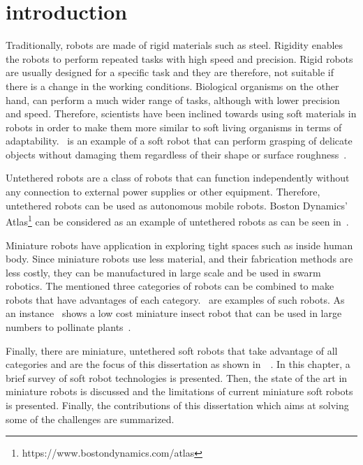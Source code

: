\graphicspath{{Images/intro/}}
\chapter{introduction}
\label{chap:intro}
Traditionally, robots are made of rigid materials such as steel. Rigidity enables the robots to perform repeated tasks with high speed and precision. Rigid robots are usually designed for a specific task and they are therefore, not suitable if there is a change in the working conditions. Biological organisms on the other hand, can perform a much wider range of tasks, although with lower precision and speed. Therefore, scientists have been inclined towards using soft materials in robots in order to make them more similar to soft living organisms in terms of adaptability.~ is an example of a soft robot that can perform grasping of delicate objects without damaging them regardless of their shape or surface roughness~\cite{Li2019}.

Untethered robots are a class of robots that can function independently without any connection to external power supplies or other equipment. Therefore, untethered robots can be used as autonomous mobile robots. Boston Dynamics' Atlas\footnote{https://www.bostondynamics.com/atlas\label{fn:boston}} can be considered as an example of untethered robots as can be seen in~. 

Miniature robots have application in exploring tight spaces such as inside human body. Since miniature robots use less material, and their fabrication methods are less costly, they can be manufactured in large scale and be used in swarm robotics. The mentioned three categories of robots can be combined to make robots that have advantages of each category.~ are examples of such robots. As an instance~ shows a low cost miniature insect robot that can be used in large numbers to pollinate plants~\cite{Jafferis2019}. 

Finally, there are miniature, untethered soft robots that take advantage of all categories and are the focus of this dissertation as shown in~~\cite{Khodambashi2021untethered}. In this chapter, a brief survey of soft robot technologies is presented. Then, the state of the art in miniature robots is discussed and the limitations of current miniature soft robots is presented. Finally, the contributions of this dissertation which aims at solving some of the challenges are summarized.
 
